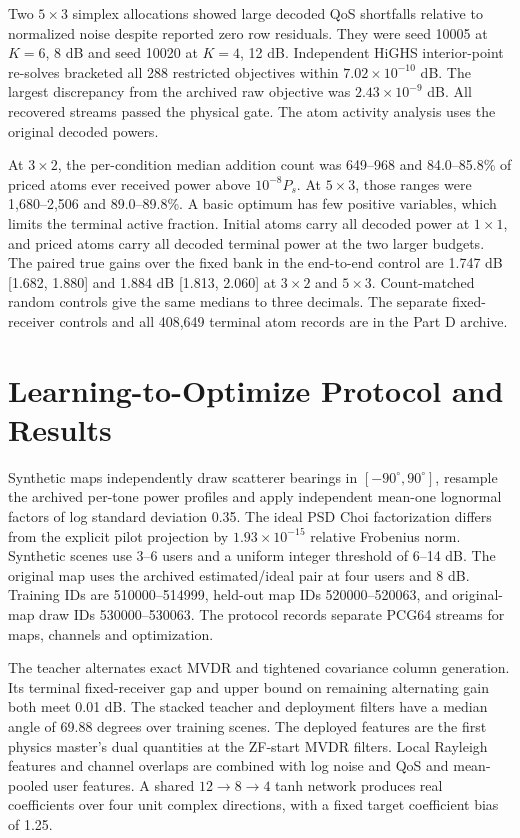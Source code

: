 \documentclass[journal]{IEEEtran}
\begin{document}
Two \(5\times3\) simplex allocations showed large decoded QoS shortfalls relative to normalized noise despite reported zero row residuals. They were seed 10005 at \(K=6\), 8 dB and seed 10020 at \(K=4\), 12 dB. Independent HiGHS interior-point re-solves bracketed all 288 restricted objectives within \(7.02\times10^{-10}\) dB. The largest discrepancy from the archived raw objective was \(2.43\times10^{-9}\) dB. All recovered streams passed the physical gate. The atom activity analysis uses the original decoded powers.

At \(3\times2\), the per-condition median addition count was 649--968 and 84.0--85.8\% of priced atoms ever received power above \(10^{-8}P_s\). At \(5\times3\), those ranges were 1,680--2,506 and 89.0--89.8\%. A basic optimum has few positive variables, which limits the terminal active fraction. Initial atoms carry all decoded power at \(1\times1\), and priced atoms carry all decoded terminal power at the two larger budgets. The paired true gains over the fixed bank in the end-to-end control are 1.747 dB [1.682, 1.880] and 1.884 dB [1.813, 2.060] at \(3\times2\) and \(5\times3\). Count-matched random controls give the same medians to three decimals. The separate fixed-receiver controls and all 408,649 terminal atom records are in the Part D archive.

\section{Learning-to-Optimize Protocol and Results}
Synthetic maps independently draw scatterer bearings in \([-90^\circ,90^\circ]\), resample the archived per-tone power profiles and apply independent mean-one lognormal factors of log standard deviation 0.35. The ideal PSD Choi factorization differs from the explicit pilot projection by \(1.93\times10^{-15}\) relative Frobenius norm. Synthetic scenes use 3--6 users and a uniform integer threshold of 6--14 dB. The original map uses the archived estimated/ideal pair at four users and 8 dB. Training IDs are 510000--514999, held-out map IDs 520000--520063, and original-map draw IDs 530000--530063. The protocol records separate PCG64 streams for maps, channels and optimization.

The teacher alternates exact MVDR and tightened covariance column generation. Its terminal fixed-receiver gap and upper bound on remaining alternating gain both meet 0.01 dB. The stacked teacher and deployment filters have a median angle of 69.88 degrees over training scenes. The deployed features are the first physics master's dual quantities at the ZF-start MVDR filters. Local Rayleigh features and channel overlaps are combined with log noise and QoS and mean-pooled user features. A shared \(12\to8\to4\) tanh network produces real coefficients over four unit complex directions, with a fixed target coefficient bias of 1.25.
\end{document}
